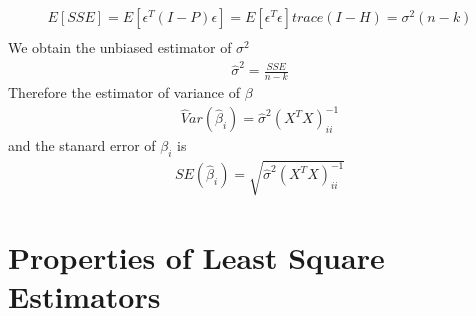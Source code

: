 \documentclass[a4paper]{article}
\begin{document}
\begin{align*}
E[SSE] = E[\epsilon^T(I-P)\epsilon] = E[\epsilon^T \epsilon] trace(I-H)
          = \sigma^2(n-k)\\
\end{align*}
We obtain the unbiased estimator of $\sigma^2$\\
\begin{align*}
\hat \sigma^2 = \frac{SSE}{n-k}
\end{align*}
Therefore the estimator of variance of $\beta$
\begin{align*}
\hat Var(\hat \beta_i) = \hat \sigma^2(X^TX)^{-1}_{ii}
\end{align*}
and the stanard error of $\beta_i$ is
\begin{align*}
SE(\hat \beta_i) = \sqrt{ \hat \sigma^2(X^TX)^{-1}_{ii}}
\end{align*}
\section{Properties of Least Square Estimators}
\end{document}
